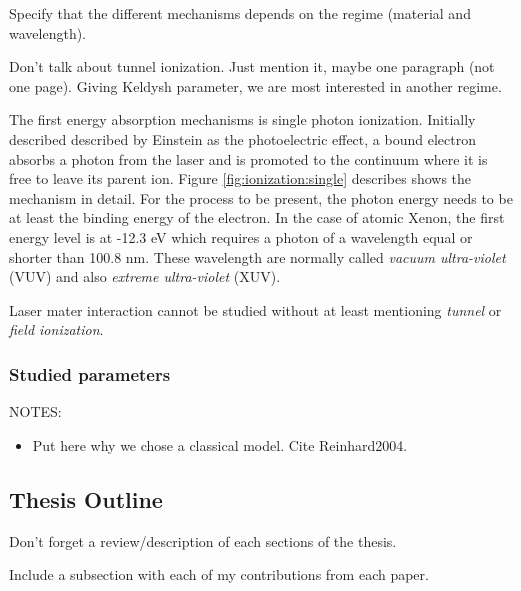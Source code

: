 Specify that the different mechanisms depends on the regime (material and
wavelength).

Don't talk about tunnel ionization. Just mention it, maybe one paragraph (not
one page). Giving Keldysh parameter, we are most interested in another regime.


The first energy absorption mechanisms is single photon ionization. Initially
described described by Einstein as the photoelectric effect, a bound electron
absorbs a photon from the laser and is promoted to the continuum where it is
free to leave its parent ion. Figure \ref{fig:ionization:single} describes
shows the mechanism in detail. For the process to be present, the photon energy
needs to be at least the binding energy of the electron. In the case of
atomic Xenon, the first energy level is at -12.3 eV which requires a photon
of a wavelength equal or shorter than 100.8 nm. These wavelength are normally
called \textit{vacuum ultra-violet} (VUV) and also \textit{extreme
ultra-violet} (XUV).




Laser mater interaction cannot be studied without at least mentioning
\textit{tunnel} or \textit{field ionization}.



\subsubsection{Studied parameters}
NOTES:
\begin{itemize}
\item Put here why we chose a classical model. Cite
Reinhard2004\cite{Reinhard2004}.
\end{itemize}






\subsection{Thesis Outline}
Don't forget a review/description of each sections of the thesis.

Include a subsection with each of my contributions from each paper.

